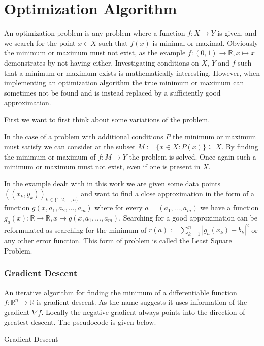 \chapter{Optimization Algorithm}
\label{chapter:optimization}

An optimization problem is any problem where a function $f:X \rightarrow Y$ is given, and we search for the point $x \in X$ such that $f(x)$ is minimal or maximal. Obviously the minimum or maximum must not exist, as the example $f: (0, 1) \rightarrow \mathbb{R}, x \mapsto x$ demonstrates by not having either. Investigating conditions on $X$, $Y$ and $f$ such that a minimum or maximum exists is mathematically interesting. However, when implementing an optimization algorithm the true minimum or maximum can sometimes not be found and is instead replaced by a sufficiently good approximation.

First we want to first think about some variations of the problem.

In the case of a problem with additional conditions $P$ the minimum or maximum must satisfy we can consider at the subset $M:= \{x \in X: P(x)\} \subseteq X$. By finding the minimum or maximum of $f: M \rightarrow Y$ the problem is solved. Once again such a minimum or maximum must not exist, even if one is present in $X$.


In the example dealt with in this work we are given some data points $((x_k, y_k))_{k \in \{1, 2, ..., n\}}$ and want to find a close approximation in the form of a function $g(x, a_1, a_2, ..., a_m)$ where for every $a = (a_1, ..., a_m)$ we have a function $g_a(x) : \mathbb{R} \rightarrow \mathbb{R}, x \mapsto g(x, a_1, ..., a_m)$. Searching for a good approximation can be reformulated as searching for the minimum of $r(a) := \sum_{k=1}^{n} |g_a(x_k) - b_k|^2$ or any other error function. This form of problem is called the Least Square Problem.

\subsection{Gradient Descent}

An iterative algorithm for finding the minimum of a differentiable function $f: \mathbb{R}^n \rightarrow \mathbb{R}$ is gradient descent. As the name suggests it uses information of the gradient $\nabla f$. Locally the negative gradient always points into the direction of greatest descent. The pseudocode is given below.

\begin{algorithm}[H] \label{alg:gradient_descent}
	\SetAlgoLined
	\DontPrintSemicolon
	\LinesNumbered
	\caption{Gradient Descent}
	
	\BlankLine
\end{algorithm}

